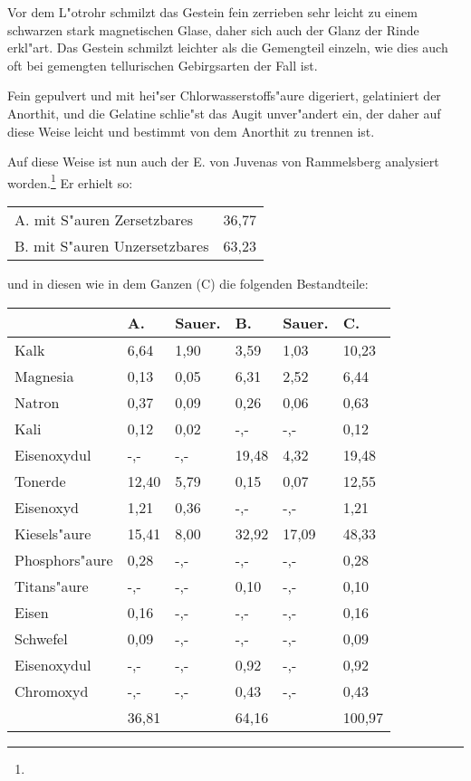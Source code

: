 \documentclass[a4paper, 11pt, oneside]{article}
\begin{document}
Vor dem L"otrohr schmilzt das Gestein fein zerrieben sehr leicht zu einem schwarzen stark magnetischen Glase, daher sich auch der Glanz der Rinde erkl"art. Das Gestein schmilzt leichter als die Gemengteil einzeln, wie dies auch oft bei gemengten tellurischen Gebirgsarten der Fall ist.

Fein gepulvert und mit hei"ser Chlorwasserstoffs"aure digeriert, gelatiniert der Anorthit, und die Gelatine schlie"st das Augit unver"andert ein, der daher auf diese Weise leicht und bestimmt von dem Anorthit zu trennen ist.

Auf diese Weise ist nun auch der E. von Juvenas von Rammelsberg analysiert worden.\footnote{} Er erhielt so:
\begin{center}
\begin{tabular}{ l r }
    A. mit S"auren Zersetzbares & 36,77\\
    B. mit S"auren Unzersetzbares & 63,23\\
\end{tabular}
\end{center}
und in diesen wie in dem Ganzen (C) die folgenden Bestandteile:
\begin{center}
\end{center}
\begin{center}
\begin{tabular}{ |p{23mm}|p{12mm}|p{8mm}|p{13mm}|p{8mm}|p{11mm}| }
    \hline
     & A. & Sauer. & B. & Sauer. & C.\\
    \hline\hline
    Kalk & 6,64 & 1,90 & 3,59 & 1,03 & 10,23\\\hline
    Magnesia & 0,13 & 0,05 & 6,31 & 2,52 & 6,44\\\hline
    Natron & 0,37 & 0,09 & 0,26 & 0,06 & 0,63\\\hline
    Kali & 0,12 & 0,02 & -,- & -,- & 0,12\\\hline
    Eisenoxydul & -,- & -,- & 19,48 & 4,32 & 19,48\\\hline
    Tonerde & 12,40 & 5,79 & 0,15 & 0,07 & 12,55\\\hline
    Eisenoxyd & 1,21 & 0,36 & -,- & -,- & 1,21\\\hline
    Kiesels"aure & 15,41 & 8,00 & 32,92 & 17,09 & 48,33\\\hline
    Phosphors"aure & 0,28 & -,- & -,- & -,- & 0,28\\\hline
    Titans"aure & -,- & -,- & 0,10 & -,- & 0,10\\\hline
    Eisen & 0,16 & -,- & -,- & -,- & 0,16\\\hline
    Schwefel & 0,09 & -,- & -,- & -,- & 0,09\\\hline
    Eisenoxydul & -,- & -,- & 0,92 & -,- & 0,92\\\hline
    Chromoxyd & -,- & -,- & 0,43 & -,- & 0,43\\\hline
     & 36,81 & & 64,16 & & 100,97\\
    \hline
\end{tabular}
\end{center}
\end{document}
